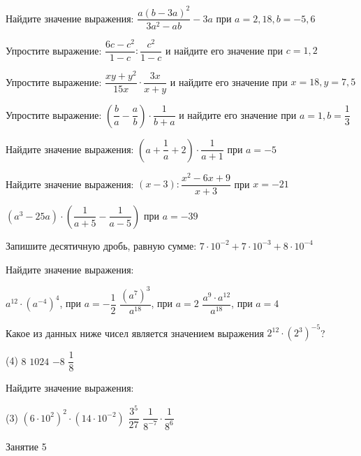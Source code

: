 \begin{homework}[number=2]
	\begin{listofex}
		\item Найдите значение выражения: \(\dfrac{a(b-3a)^2}{3a^2-ab}-3a\) при \(a=2,18, b=-5,6\)
		\item Упростите выражение: \(\dfrac{6c-c^2}{1-c}:\dfrac{c^2}{1-c}\) и найдите его значение при \(c=1,2\)
		\item Упростите выражение: \(\dfrac{xy+y^2}{15x}\cdot \dfrac{3x}{x+y}\) и найдите его значение при \(x=18, y=7,5\)
		\item Упростите выражение: \(\left(\dfrac{b}{a}-\dfrac{a}{b}\right) \cdot \dfrac{1}{b+a}\) и найдите его значение при \(a=1, b=\dfrac{1}{3}\)
		\item Найдите значение выражения: \(\left(a+\dfrac{1}{a}+2\right) \cdot \dfrac{1}{a+1}\) при \(a=-5\)
		\item Найдите значение выражения: \( (x-3):\dfrac{x^2-6x+9}{x+3} \) при \(x=-21\)
		\item \((a^3-25a) \cdot \left( \dfrac{1}{a+5} - \dfrac{1}{a-5} \right)\) при \(a=-39\)
		\item Запишите десятичную дробь, равную сумме: \( 7 \cdot 10^{-2} + 7 \cdot 10^{-3} + 8 \cdot 10^{-4}\)
		\item Найдите значение выражения:
		\begin{tasks}
			\task \( a^{12} \cdot (a^{-4})^4 \), при \(a = -\dfrac{1}{2}\)
			\task \(\dfrac{(a^7)^3}{a^{18}}\), при \(a=2\)
			\task \( \dfrac{a^9 \cdot a^{12}}{a^{18}} \), при \(a=4\)
		\end{tasks}
		\item Какое из данных ниже чисел является значением выражения \(2^{12} \cdot (2^3)^{-5}\)?
		\begin{tasks}(4)
			\task \(8\)
			\task \(1024\)
			\task \(-8\)
			\task \(\dfrac{1}{8}\)
		\end{tasks}
		\item Найдите значение выражения:
		\begin{tasks}(3)
			\task \( (6 \cdot 10^2)^2 \cdot (14 \cdot 10^{-2}) \)
			\task \( \dfrac{3^5}{27} \)
			\task \( \dfrac{1}{8^{-7}} \cdot \dfrac{1}{8^6} \)
		\end{tasks}
	\end{listofex}
\end{homework}

\begin{class}[number=5]
	\begin{listofex}
		\item Занятие 5
	\end{listofex}
\end{class}

